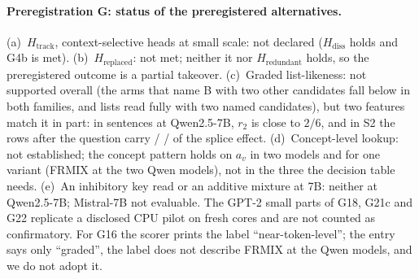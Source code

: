 \begin{table}[p]
\centering
\footnotesize
\caption{\textbf{Preregistration G.} GPU stage 5, scored by \texttt{analysis/stage5\_score.py}. Predictions, scoring script and code were finalised together before any stage-5 GPU run; a first attempt stopped in the unit tests before any model was loaded, and the entry was re-finalised with test-only changes at \texttt{stage5-run}, the commit the run used. Parts (a)--(d): the 150 seed-0 story cores of stages 1 and 3b (the row splice and the form probe on the first 60); part (e): 200 fresh IOI cores. Triples are Qwen2.5-7B / Qwen2.5-14B / Mistral-7B (Instruct) unless the row says otherwise; G2 and G3 concern Qwen2.5-1.5B and 3B; part (d) adds OLMo-2-7B and is met if at least three evaluable models meet it. A prediction with sub-verdicts is not met unless every sub-verdict is met (the scorer's rule); the Observed column gives the sub-verdicts. 95\% core-bootstrap CIs. In all, \GcountMet{} met and \GcountNotMet{} not met; none was not evaluable. Details in \cref{app:stage5}.}
\label{tab:prereg-g}
{\scriptsize}
\end{table}

\paragraph{Preregistration G: status of the preregistered alternatives.} (a)~$H_{\mathrm{track}}$, context-selective heads at small scale: not declared ($H_{\mathrm{diss}}$ holds and G4b is met). (b)~$H_{\mathrm{replaced}}$: not met; neither it nor $H_{\mathrm{redundant}}$ holds, so the preregistered outcome is a partial takeover. (c)~Graded list-likeness: not supported overall (the arms that name B with two other candidates fall below \fmtNone{} in both families, and lists read fully with two named candidates), but two features match it in part: in sentences at Qwen2.5-7B, $r_2$ is close to $2/6$, and in S2 the rows after the question carry \GtwelveRestStwoQwenSeven{} / \GtwelveRestStwoQwenFourteen{} / \GtwelveRestStwoMistralSeven{} of the splice effect. (d)~Concept-level lookup: not established; the concept pattern holds on $a_v$ in two models and for one variant (FRMIX at the two Qwen models), not in the three the decision table needs. (e)~An inhibitory key read or an additive mixture at 7B: neither at Qwen2.5-7B; Mistral-7B not evaluable. The GPT-2 small parts of G18, G21c and G22 replicate a disclosed CPU pilot on fresh cores and are not counted as confirmatory. For G16 the scorer prints the label ``near-token-level''; the entry says only ``graded'', the label does not describe FRMIX at the Qwen models, and we do not adopt it.


